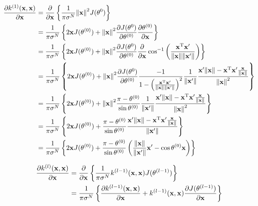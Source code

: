 \documentclass[11pt,a4j]{article}
\begin{document}
    \begin{align}
      \frac{\partial k^{(1)}({\bf x}, {\bf x})}{\partial {\bf x}} 
      &= \frac{\partial}{\partial {\bf x}} \left\{ \frac{1}{\pi \sigma^N} {\|{\bf x}\|}^2 J(\theta^{0}) \right\} \\
      &= \frac{1}{\pi \sigma^N} \left\{ 2 {\bf x} J(\theta^{(0)}) + {\|{\bf x}\|}^2 \frac{\partial J(\theta^{0})}{\partial \theta^{(0)}} \frac{\partial \theta^{(0)}}{\partial {\bf x}} \right\} \\
      &= \frac{1}{\pi \sigma^N} \left\{ 2 {\bf x} J(\theta^{(0)}) + {\|{\bf x}\|}^2 \frac{\partial J(\theta^{0})}{\partial \theta^{(0)}} \frac{\partial}{\partial {\bf x}} \cos^{-1} \left( \frac{ {\bf x}^{\mathrm{T}} {\bf x}'}{\|{\bf x}\| \|{\bf x}'\|} \right) \right\} \\
      &= \frac{1}{\pi \sigma^N} \left\{ 2 {\bf x} J(\theta^{(0)}) + {\|{\bf x}\|}^2 \frac{\partial J(\theta^{0})}{\partial \theta^{(0)}} \frac{-1}{1 - { \left( \frac{ {\bf x}^{\mathrm{T}} {\bf x}'}{\|{\bf x}\| \|{\bf x}'\|} \right) }^2} \frac{1}{\|{\bf x}'\|} \frac{{\bf x}'\|{\bf x}\| - {\bf x}^{\mathrm{T}}{\bf x}' \frac{\bf x}{\|{\bf x}\|}}{{\|{\bf x}\|}^2} \right\} \\
      &= \frac{1}{\pi \sigma^N} \left\{ 2 {\bf x} J(\theta^{(0)}) + {\|{\bf x}\|}^2 \frac{\pi - \theta^{(0)}}{\sin \theta^{(0)}} \frac{1}{\|{\bf x}'\|} \frac{{\bf x}'\|{\bf x}\| - {\bf x}^{\mathrm{T}}{\bf x}' \frac{\bf x}{\|{\bf x}\|}}{{\|{\bf x}\|}^2} \right\} \\
      &= \frac{1}{\pi \sigma^N} \left\{ 2 {\bf x} J(\theta^{(0)}) + \frac{\pi - \theta^{(0)}}{\sin \theta^{(0)}} \frac{{\bf x}'\|{\bf x}\| - {\bf x}^{\mathrm{T}}{\bf x}' \frac{\bf x}{\|{\bf x}\|}}{{\|{\bf x}'\|}} \right\} \\
      &= \frac{1}{\pi \sigma^N} \left\{ 2 {\bf x} J(\theta^{(0)}) + \frac{\pi - \theta^{(0)}}{\sin \theta^{(0)}} \left( \frac{\|{\bf x}\|}{\|{\bf x}'\|}{\bf x}' - \cos \theta^{(0)} {\bf x} \right) \right\}
    \end{align}

    \begin{align}
      \frac{\partial k^{(l)}({\bf x}, {\bf x})}{\partial {\bf x}} 
      &= \frac{\partial}{\partial {\bf x}} \left\{ \frac{1}{\pi \sigma^N} k^{(l-1)}({\bf x}, {\bf x}) J(\theta^{(l-1)}) \right\} \\
      &= \frac{1}{\pi \sigma^N} \left\{ \frac{\partial k^{(l-1)}({\bf x}, {\bf x})}{\partial {\bf x}} + k^{(l-1)}({\bf x}, {\bf x}) \frac{\partial J(\theta^{(l-1)})}{\partial {\bf x}} \right\} \\
    \end{align}
\end{document}
